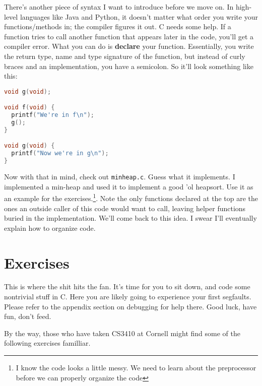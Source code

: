 \documentclass[ebook,11pt,oneside,openany]{memoir}
\newcommand{\cf}[1]{\texttt{#1}}
\begin{document}
There's another piece of syntax I want to introduce before we move on. In high-level languages like Java and Python, it doesn't matter what order you write your functions/methods in; the compiler figures it out. C needs some help. If a function tries to call another function that appears later in the code, you'll get a compiler error. What you can do is \textbf{declare} your function. Essentially, you write the return type, name and type signature of the function, but instead of curly braces and an implementation, you have a semicolon. So it'll look something like this:

\begin{lstlisting}[language=C]
void g(void);

void f(void) {
  printf("We're in f\n");
  g();
}

void g(void) {
  printf("Now we're in g\n");
}
\end{lstlisting}


Now with that in mind, check out \cf{minheap.c}. Guess what it implements. I implemented a min-heap and used it to implement a good 'ol heapsort. Use it as an example for the exercises.\footnote{I know the code looks a little messy. We need to learn about the preprocessor before we can properly organize the code}. Note the only functions declared at the top are the ones an outside caller of this code would want to call, leaving helper functions buried in the implementation. We'll come back to this idea. I swear I'll eventually explain how to organize code.

\section{Exercises}

This is where the shit hits the fan. It's time for you to sit down, and code some nontrivial stuff in C. Here you are likely going to experience your first segfaults. Please refer to the appendix section on debugging for help there. Good luck, have fun, don't feed.

\noindent
By the way, those who have taken CS3410 at Cornell might find some of the following exercises familliar.
\end{document}
